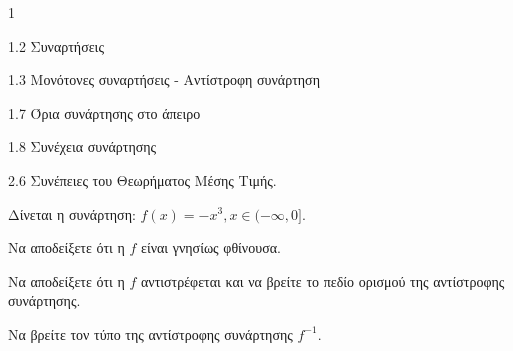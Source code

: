 \begin{ylh}{1}
    \item 1.2 Συναρτήσεις
    \item 1.3 Μονότονες συναρτήσεις - Αντίστροφη συνάρτηση
    \item 1.7 Όρια συνάρτησης στο άπειρο
    \item 1.8 Συνέχεια συνάρτησης
    \item 2.6 Συνέπειες του Θεωρήματος Μέσης Τιμής.
\end{ylh}
Δίνεται η συνάρτηση: $f(x)=-x^3, x \in (-\infty,0]$.
\begin{alist}
\item Να αποδείξετε ότι η $f$ είναι γνησίως φθίνουσα. 
\item Να αποδείξετε ότι η $f$ αντιστρέφεται και να βρείτε το πεδίο ορισμού της αντίστροφης συνάρτησης. 
\item Να βρείτε τον τύπο της αντίστροφης συνάρτησης $f^{-1}$. 
\end{alist}